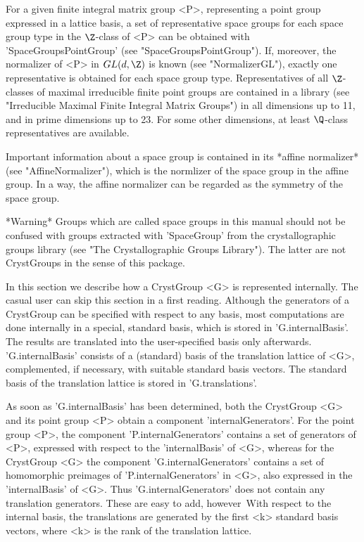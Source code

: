 For a given finite integral matrix  group <P>, representing a point group
expressed in a  lattice basis, a  set of representative  space groups for
each space  group type  in the $\Z$-class  of <P>  can  be  obtained with
'SpaceGroupsPointGroup' (see "SpaceGroupsPointGroup").  If, moreover, the
normalizer of <P>  in  $GL(d,\Z)$ is known (see  "NormalizerGL"), exactly
one   representative  is     obtained  for  each    space    group  type.
Representatives of all  $\Z$-classes of maximal irreducible finite  point
groups are contained in a {\GAP} library (see "Irreducible Maximal Finite
Integral  Matrix  Groups") in  all dimensions   up to 11,   and  in prime
dimensions up to  23.   For some  other  dimensions, at  least $\Q$-class
representatives are available.
 
Important information about  a space group is   contained in its  *affine
normalizer* (see "AffineNormalizer"), which is the normlizer of the space
group   in the affine   group.  In  a way,  the  affine normalizer can be
regarded as the symmetry of the space group.

*Warning\:* Groups which are called  space groups  in this manual  should
not  be  confused  with  groups  extracted  with  'SpaceGroup'  from  the
crystallographic   groups library    (see  "The  Crystallographic  Groups
Library"). The latter are not CrystGroups in the sense of this package.


In  this  section  we  describe  how  a  CrystGroup  <G>  is  represented
internally.  The casual  user can skip this section  in  a first reading.
Although the generators of a CrystGroup can be  specified with respect to
any basis,  most computations are  done internally in a special, standard
basis, which is stored  in 'G.internalBasis'. The results  are translated
into the user-specified basis only afterwards. 'G.internalBasis' consists
of a (standard) basis of the translation lattice of <G>, complemented, if
necessary, with  suitable standard basis vectors.  The standard  basis of
the translation lattice is stored in 'G.translations'.

As soon as 'G.internalBasis' has been determined, both the CrystGroup <G>
and its point group <P> obtain a component 'internalGenerators'.  For the
point group <P>, the  component 'P.internalGenerators' contains a set  of
generators of <P>, expressed with  respect to the 'internalBasis' of <G>,
whereas for  the  CrystGroup  <G> the   component  'G.internalGenerators'
contains a set of homomorphic preimages of 'P.internalGenerators' in <G>,
also expressed in the 'internalBasis' of <G>. Thus 'G.internalGenerators'
does  not  contain any translation  generators.  These are   easy to add,
however\:\ With respect   to the internal  basis,   the translations  are
generated by the first <k> standard basis vectors, where  <k> is the rank
of the translation lattice.

